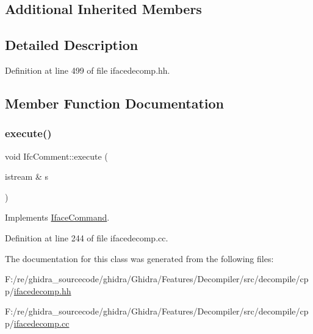 \subsection*{Additional Inherited Members}


\subsection{Detailed Description}


Definition at line 499 of file ifacedecomp.\+hh.



\subsection{Member Function Documentation}
\mbox{\label{class_ifc_comment_ab3ec87a9d5332b0f4c10bd349f807650}} 
\subsubsection{\texorpdfstring{execute()}{execute()}}
{\footnotesize\ttfamily void Ifc\+Comment\+::execute (\begin{DoxyParamCaption}\item[{istream \&}]{s }\end{DoxyParamCaption})\hspace{0.3cm}{\ttfamily [virtual]}}



Implements \mbox{\hyperlink{class_iface_command_af10e29cee2c8e419de6efe9e680ad201}{Iface\+Command}}.



Definition at line 244 of file ifacedecomp.\+cc.



The documentation for this class was generated from the following files\+:\begin{DoxyCompactItemize}
\item 
F\+:/re/ghidra\+\_\+sourcecode/ghidra/\+Ghidra/\+Features/\+Decompiler/src/decompile/cpp/\mbox{\hyperlink{ifacedecomp_8hh}{ifacedecomp.\+hh}}\item 
F\+:/re/ghidra\+\_\+sourcecode/ghidra/\+Ghidra/\+Features/\+Decompiler/src/decompile/cpp/\mbox{\hyperlink{ifacedecomp_8cc}{ifacedecomp.\+cc}}\end{DoxyCompactItemize}
